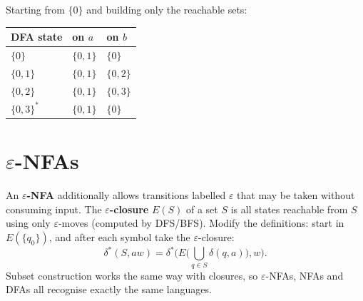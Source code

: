 \begin{example}
Starting from $\{0\}$ and building only the reachable sets:
\begin{center}
\begin{tabular}{lll}
\toprule
DFA state & on $a$ & on $b$ \\
\midrule
$\{0\}$ & $\{0,1\}$ & $\{0\}$ \\
$\{0,1\}$ & $\{0,1\}$ & $\{0,2\}$ \\
$\{0,2\}$ & $\{0,1\}$ & $\{0,3\}$ \\
$\{0,3\}^\ast$ & $\{0,1\}$ & $\{0\}$ \\
\bottomrule
\end{tabular}
\end{center}
\begin{center}
\end{center}
\end{example}

\section{\texorpdfstring{$\varepsilon$}{Epsilon}-NFAs}

An \textbf{$\varepsilon$-NFA} additionally allows transitions labelled $\varepsilon$ that may be
taken without consuming input. The \textbf{$\varepsilon$-closure} $E(S)$ of a set $S$ is all
states reachable from $S$ using only $\varepsilon$-moves (computed by DFS/BFS). Modify the
definitions: start in $E(\{q_0\})$, and after each symbol take the $\varepsilon$-closure:
\[
  \delta^*(S, aw) = \delta^*\Big(E\big(\textstyle\bigcup_{q\in S}\delta(q,a)\big), w\Big).
\]
Subset construction works the same way with closures, so $\varepsilon$-NFAs, NFAs and DFAs
all recognise exactly the same languages.

